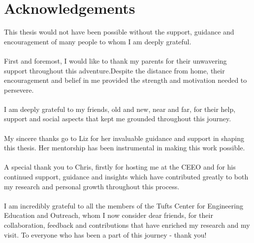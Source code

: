 \chapter*{Acknowledgements}%
%
%

This thesis would not have been possible without the support, guidance and encouragement of many people to whom I am deeply grateful.\\\\

First and foremost, I would like to thank my parents for their unwavering support throughout this adventure.Despite the distance from home, their encouragement and belief in me provided the strength and motivation needed to persevere.\\\\

I am deeply grateful to my friends, old and new, near and far, for their help, support and social aspects that kept me grounded throughout this journey. \\\\

My sincere thanks go to Liz for her invaluable guidance and support in shaping this thesis. Her mentorship has been instrumental in making this work possible. \\\\

A special thank you to Chris, firstly for hosting me at the CEEO and for his continued support, guidance and insights which have contributed greatly to both my research and personal growth throughout this process. \\\\

I am incredibly grateful to all the members of the Tufts Center for Engineering Education and Outreach, whom I now consider dear friends, for their collaboration, feedback and contributions that have enriched my research and my visit. To everyone who has been a part of this journey - thank you!